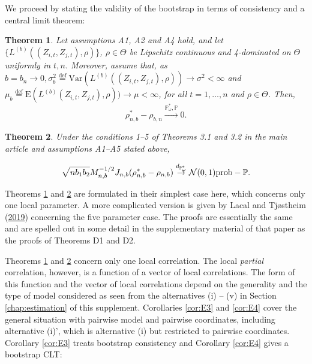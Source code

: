 \documentclass[
  12pt,
  letterpaper]{article}
\newtheorem{thm}{Theorem}[section]
\numberwithin{equation}{section}
\newcommand{\E}{\textrm{E}}
\newcommand{\Var}{\textrm{Var}}
\begin{document}
We proceed by stating the validity of the bootstrap in terms of consistency and a central limit theorem:

\begin{thm}
Let assumptions A1, A2 and A4 hold, and  let $\{L^{(b)}((Z_{i,t},Z_{j,t}),\rho)\}$, $\rho \in \Theta$ be Lipschitz continuous and 4-dominated on $\Theta$ uniformly in $t,n$. Moreover, assume that, as $b=b_n \to 0, \sigma_b^2 \stackrel{\textrm{def}}{=} \Var(L^{(b)}((Z_{i,t},Z_{j,t}),\rho)) \to \sigma^2 < \infty$ and $\mu_b \stackrel{\textrm{def}}{=} \E(L^{(b)}(Z_{i,t},Z_{j,t}),\rho)) \to \mu < \infty$, for all $t=1,\ldots,n$ and $\rho \in \Theta$. 
Then,
\begin{equation}
\rho_{n,b}^* - \rho_{b,n} \stackrel {\mathbb{P}_{\omega}^{*},\mathbb{P}}{\to} 0.
\label{eq:thmB}
\end{equation}
\label{thm:E1}
\end{thm}

\begin{thm}
Under the conditions 1--5 of Theorems 3.1 and 3.2 in the  main article and assumptions A1--A5 stated above,

\begin{equation}
\sqrt{nb_1b_2} M_{n,b}^{-1/2}J_{n,b}(\rho_{n,b}^{*} - \rho_{n,b}) \stackrel {d_{\mathbb{P}_{\omega}^{*}}}{\to} {\cal N}(0,1)\mbox{prob}-\mathbb{P}.
\end{equation}
\label{thm:E2}
\end{thm}

Theorems \ref{thm:E1} and \ref{thm:E2} are formulated in their simplest case here, which concerns only one local parameter. A more complicated version is given by Lacal and Tjøstheim (\protect\hyperlink{ref-lacal2018estimating}{2019}) concerning the five parameter case. The proofs are essentially the same and are spelled out in some detail in the supplementary material of that paper as the proofs of Theorems D1 and D2.

Theorems \ref{thm:E1} and \ref{thm:E2} concern only one local correlation. The local \emph{partial} correlation, however, is a function of a vector of local correlations. The form of this function and the vector of local correlations depend on the generality and the type of model considered as seen from the alternatives (i) -- (v) in Section \ref{chap:estimation} of this supplement. Corollaries \ref{cor:E3} and \ref{cor:E4} cover the general situation with pairwise model and pairwise coordinates, including alternative (i)', which is alternative (i) but restricted to pairwise coordinates. Corollary \ref{cor:E3} treats bootstrap consistency and Corollary \ref{cor:E4} gives a bootstrap CLT:
\end{document}
